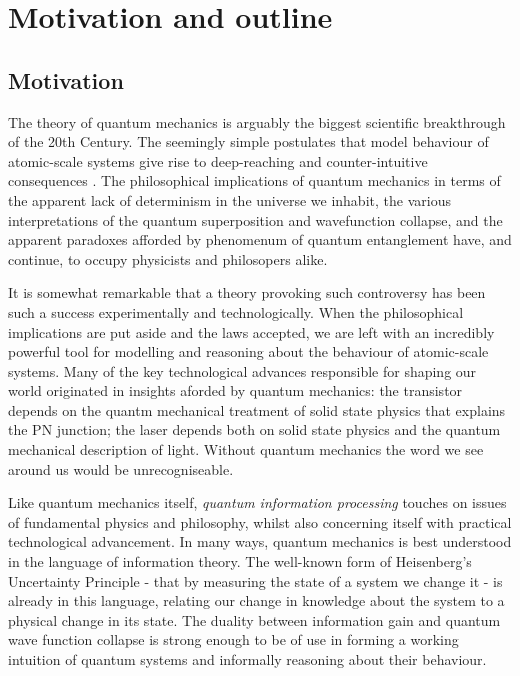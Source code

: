 \chapter{Motivation and outline} 
\label{ch:Motivation}

\section{Motivation}

The theory of quantum mechanics is arguably the biggest scientific breakthrough of the 20th Century. The seemingly simple postulates that model behaviour of atomic-scale systems give rise to deep-reaching and counter-intuitive consequences .
The philosophical implications of quantum mechanics in terms of the apparent lack of determinism in the universe we inhabit, the various interpretations of the quantum superposition and wavefunction collapse, and the apparent paradoxes afforded by phenomenum of quantum entanglement have, and continue, to occupy physicists and philosopers alike.

It is somewhat remarkable that a theory provoking such controversy has been such a success experimentally and technologically. When the philosophical implications are put aside and the laws accepted, we are left with an incredibly powerful tool for modelling and reasoning about the behaviour of atomic-scale systems. Many of the key technological advances responsible for shaping our world originated in insights aforded by quantum mechanics: the transistor depends on the quantm mechanical treatment of solid state physics that explains the PN junction; the laser depends both on solid state physics and the quantum mechanical description of light. Without quantum mechanics the word we see around us would be unrecogniseable.

Like quantum mechanics itself, \textit{quantum information processing} touches on issues of fundamental physics and philosophy, whilst also concerning itself with practical technological advancement. In many ways, quantum mechanics is best understood in the language of information theory. The well-known form of Heisenberg's Uncertainty Principle - that by measuring the state of a system we change it - is already in this language, relating our change in knowledge about the system to a physical change in its state. The duality between information gain and quantum wave function collapse is strong enough to be of use in forming a working intuition of quantum systems and informally reasoning about their behaviour.


